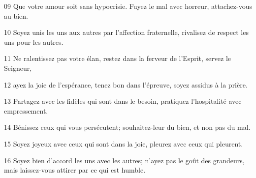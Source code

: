 
09 Que votre amour soit sans hypocrisie. Fuyez le mal avec horreur, attachez-vous au bien.

10 Soyez unis les uns aux autres par l’affection fraternelle, rivalisez de respect les uns pour les autres.

11 Ne ralentissez pas votre élan, restez dans la ferveur de l’Esprit, servez le Seigneur,

12 ayez la joie de l’espérance, tenez bon dans l’épreuve, soyez assidus à la prière.

13 Partagez avec les fidèles qui sont dans le besoin, pratiquez l’hospitalité avec empressement.

14 Bénissez ceux qui vous persécutent; souhaitez-leur du bien, et non pas du mal.

15 Soyez joyeux avec ceux qui sont dans la joie, pleurez avec ceux qui pleurent.

16 Soyez bien d’accord les uns avec les autres; n’ayez pas le goût des grandeurs, mais laissez-vous attirer par ce qui est humble.